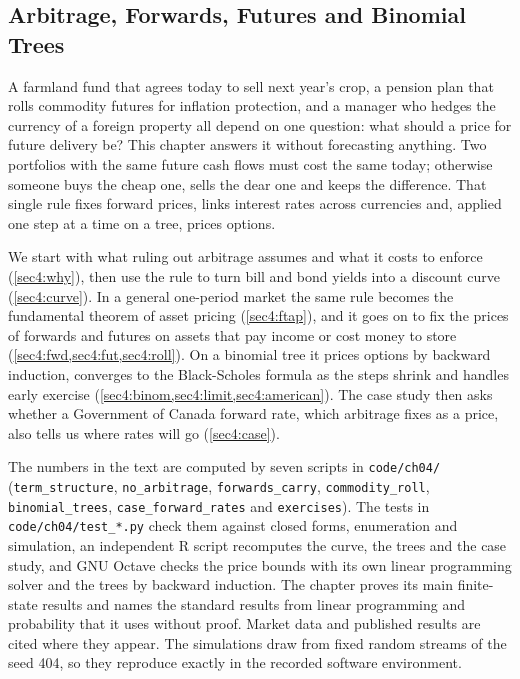 
\begin{chapterrefs}
\setcounter{chapter}{3}
\chapter{Arbitrage, Forwards, Futures and Binomial Trees}
\label{ch:arbitrage}

A farmland fund that agrees today to sell next year's crop, a pension plan that rolls commodity futures
for inflation protection, and a manager who hedges the currency of a foreign property all depend on one
question: what should a price for future delivery be? This chapter answers it without forecasting
anything. Two portfolios with the same future cash flows must cost the same today; otherwise someone
buys the cheap one, sells the dear one and keeps the difference. That single rule fixes forward
prices, links interest rates across currencies and, applied one step at a time on a tree, prices
options.

We start with what ruling out arbitrage assumes and what it costs to enforce (\cref{sec4:why}),
then use the rule to turn bill and bond yields into a discount curve (\cref{sec4:curve}). In a
general one-period market the same rule becomes the fundamental theorem of asset pricing
(\cref{sec4:ftap}), and it goes on to fix the prices of forwards and futures on assets that pay
income or cost money to store (\cref{sec4:fwd,sec4:fut,sec4:roll}). On a binomial tree it prices options by backward induction, converges to the Black-Scholes formula
as the steps shrink and handles early exercise
(\cref{sec4:binom,sec4:limit,sec4:american}). The case study then asks whether a
Government of Canada forward rate, which arbitrage fixes as a price, also tells us where rates will go
(\cref{sec4:case}).

\begin{keybox}
The numbers in the text are computed by seven scripts in \texttt{code/ch04/}
(\texttt{term\_structure}, \texttt{no\_arbitrage}, \texttt{forwards\_carry}, \texttt{commodity\_roll},
\texttt{binomial\_trees}, \texttt{case\_forward\_rates} and \texttt{exercises}). The tests in
\texttt{code/ch04/test\_*.py} check them against closed forms, enumeration and simulation, an
independent R script recomputes the curve, the trees and the case study, and GNU Octave checks the
price bounds with its own linear programming solver and the trees by backward induction. The chapter proves its main finite-state results and names the standard results from linear
programming and probability that it uses without proof. Market data and published results are cited where they appear. The simulations
draw from fixed random streams of the seed 404, so they reproduce exactly in the recorded
software environment.


\end{keybox}
\end{chapterrefs}
